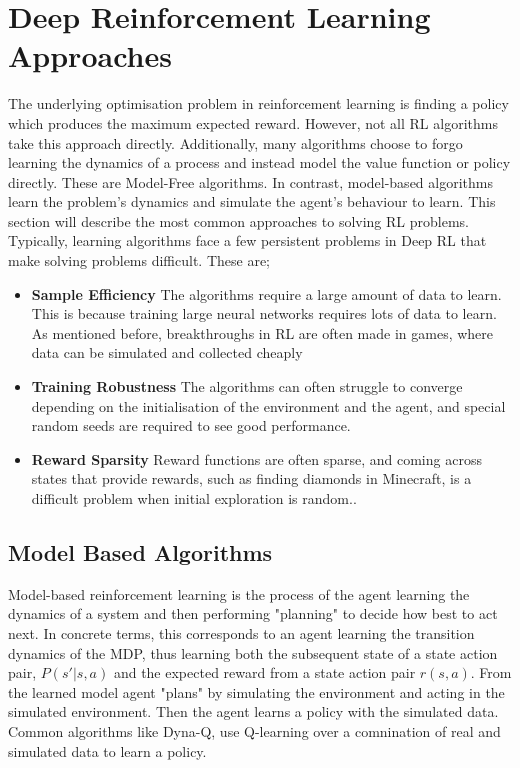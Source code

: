 \section{Deep Reinforcement Learning Approaches}
The underlying optimisation problem in reinforcement learning is finding a policy which produces the maximum expected reward. However, not all RL algorithms take this approach directly. Additionally, many algorithms choose to forgo learning the dynamics of a process and instead model the value function or policy directly. These are Model-Free algorithms. In contrast, model-based algorithms learn the problem's dynamics and simulate the agent's behaviour to learn. This section will describe the most common approaches to solving RL problems.
Typically, learning algorithms face a few persistent problems in Deep RL that make solving problems difficult. These are;
\begin{itemize}
	\item \textbf{Sample Efficiency} The algorithms require a large amount of data to learn. This is because training large neural networks requires lots of data to learn. As mentioned before, breakthroughs in RL are often made in games, where data can be simulated and collected cheaply\cite{dulac2019challenges}
	\item \textbf{Training Robustness} The algorithms can often struggle to converge depending on the initialisation of the environment and the agent, and special random seeds are required to see good performance\cite{henderson2018deep}.
	\item \textbf{Reward Sparsity} Reward functions are often sparse, and coming across states that provide rewards, such as finding diamonds in Minecraft, is a difficult problem when initial exploration is random.\cite{hafner2023mastering}.
\end{itemize}

\subsection{Model Based Algorithms}
Model-based reinforcement learning is the process of the agent learning the dynamics of a system and then performing "planning" to decide how best to act next. In concrete terms, this corresponds to an agent learning the transition dynamics of the MDP, thus learning both the subsequent state of a state action pair, $P(s'| s, a)$ and the expected reward from a state action pair $r(s, a)$. From the learned model agent "plans" by simulating the environment and acting in the simulated environment. Then the agent learns a policy with the simulated data. Common algorithms like Dyna-Q, use Q-learning over a comnination of real and simulated data to learn a policy.

